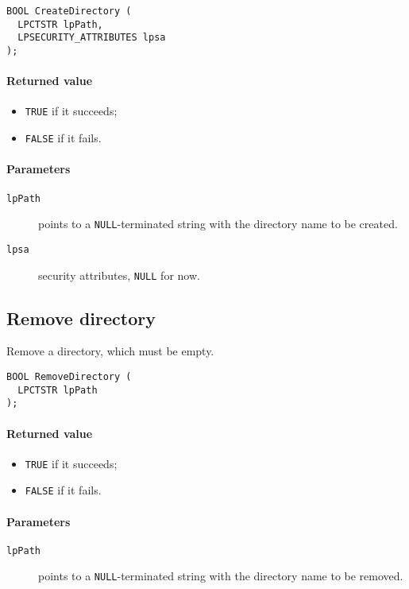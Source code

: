 \begin{verbatim}
BOOL CreateDirectory (
  LPCTSTR lpPath,
  LPSECURITY_ATTRIBUTES lpsa
);
\end{verbatim}

\paragraph{Returned value}
\begin{itemize}
\item \texttt{TRUE} if it succeeds;
\item \texttt{FALSE} if it fails.
\end{itemize}

\paragraph{Parameters}
\begin{description}
\item [\texttt{lpPath}] points to a \texttt{NULL}-terminated string with the directory name to be created.
\item [\texttt{lpsa}] security attributes, \texttt{NULL} for now.
\end{description}

\subsection{Remove directory}
Remove a directory, which must be empty.

\begin{verbatim}
BOOL RemoveDirectory (
  LPCTSTR lpPath
);
\end{verbatim}

\paragraph{Returned value}
\begin{itemize}
\item \texttt{TRUE} if it succeeds;
\item \texttt{FALSE} if it fails.
\end{itemize}

\paragraph{Parameters}
\begin{description}
\item [\texttt{lpPath}] points to a \texttt{NULL}-terminated string with the directory name to be removed.
\end{description}

